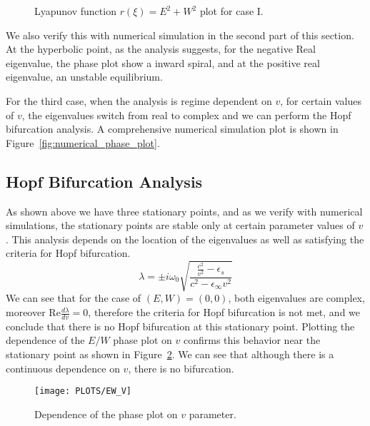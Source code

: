 \documentclass{article}[12pt]
\theoremstyle{plain}
\begin{document}
\begin{figure}[htb]
\begin{center}
\subfigure[$(E,W)=(0,0)$]{\texttt{[image: C1LY0]}}
\subfigure[$(E,W)=(2,0)$]{\texttt{[image: C1LY2]}}
\caption{Lyapunov function $r(\xi)=E^2+W^2$ plot for case I.}
\label{fig:CY1}
\end{center}
\end{figure}



We also verify this with numerical simulation in the second part of this section.
At the hyperbolic point, as the analysis suggests, for the negative Real eigenvalue, the phase plot show a inward spiral, and 
at the positive real eigenvalue, an unstable equilibrium.

For the third case, when the analysis is regime dependent on $v$, for certain values of $v$, the eigenvalues switch from
real to complex and we can perform the Hopf bifurcation analysis. A comprehensive numerical simulation plot is shown in
Figure~\ref{fig:numerical_phase_plot}.

\subsection{Hopf Bifurcation Analysis}
As shown above we have three stationary points, and as we verify with numerical simulations, the stationary points
are stable only at certain parameter values of $v$. 
This analysis depends on the location of the eigenvalues
as well as satisfying the criteria for Hopf bifurcation. 
\[
\lambda = \pm i \omega_0 \sqrt{ \frac{ \frac{c^2}{v^2} -\epsilon_s }
{c^2-\epsilon_\infty v^2}}
\]
We can see that for the case of $(E,W)=(0,0)$, both eigenvalues are complex, moreover $\mathrm{Re}\frac{d\lambda}{dv}=0$, therefore
the criteria for Hopf bifurcation is not met, and we conclude that there is no Hopf bifurcation at this stationary point.
Plotting the dependence of the $E/W$ phase plot on $v$ confirms this behavior near the stationary point as shown
in Figure~\ref{fig:vdep}. We can see that although there is a continuous dependence on $v$, there is no bifurcation.

\begin{figure}[htb]
\begin{center}
\texttt{[image: PLOTS/EW\_V]}
\caption{Dependence of the phase plot on $v$ parameter.}
\label{fig:vdep}
\end{center}
\end{figure}
\end{document}
